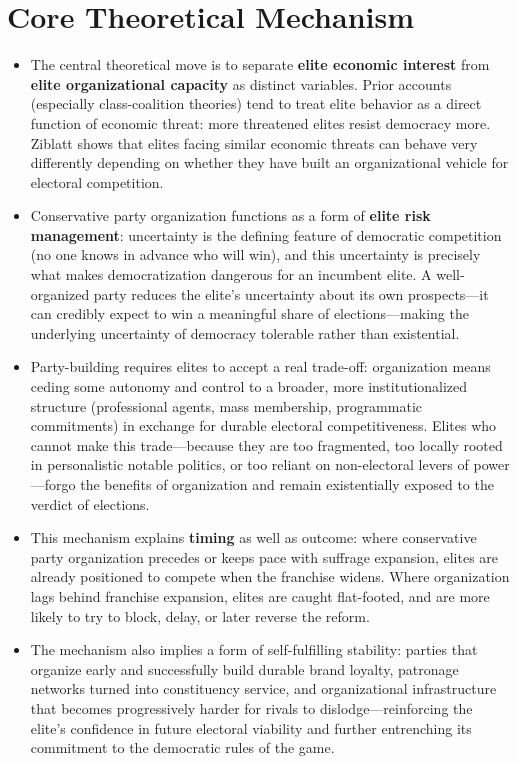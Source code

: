 \documentclass[12pt]{article}
\begin{document}
\section{Core Theoretical Mechanism}

\begin{itemize}[leftmargin=*, itemsep=4pt]
    \item The central theoretical move is to separate \textbf{elite economic interest} from \textbf{elite organizational capacity} as distinct variables. Prior accounts (especially class-coalition theories) tend to treat elite behavior as a direct function of economic threat: more threatened elites resist democracy more. Ziblatt shows that elites facing similar economic threats can behave very differently depending on whether they have built an organizational vehicle for electoral competition.
    \item Conservative party organization functions as a form of \textbf{elite risk management}: uncertainty is the defining feature of democratic competition (no one knows in advance who will win), and this uncertainty is precisely what makes democratization dangerous for an incumbent elite. A well-organized party reduces the elite's uncertainty about its own prospects---it can credibly expect to win a meaningful share of elections---making the underlying uncertainty of democracy tolerable rather than existential.
    \item Party-building requires elites to accept a real trade-off: organization means ceding some autonomy and control to a broader, more institutionalized structure (professional agents, mass membership, programmatic commitments) in exchange for durable electoral competitiveness. Elites who cannot make this trade---because they are too fragmented, too locally rooted in personalistic notable politics, or too reliant on non-electoral levers of power---forgo the benefits of organization and remain existentially exposed to the verdict of elections.
    \item This mechanism explains \textbf{timing} as well as outcome: where conservative party organization precedes or keeps pace with suffrage expansion, elites are already positioned to compete when the franchise widens. Where organization lags behind franchise expansion, elites are caught flat-footed, and are more likely to try to block, delay, or later reverse the reform.
    \item The mechanism also implies a form of self-fulfilling stability: parties that organize early and successfully build durable brand loyalty, patronage networks turned into constituency service, and organizational infrastructure that becomes progressively harder for rivals to dislodge---reinforcing the elite's confidence in future electoral viability and further entrenching its commitment to the democratic rules of the game.
\end{itemize}
\end{document}
